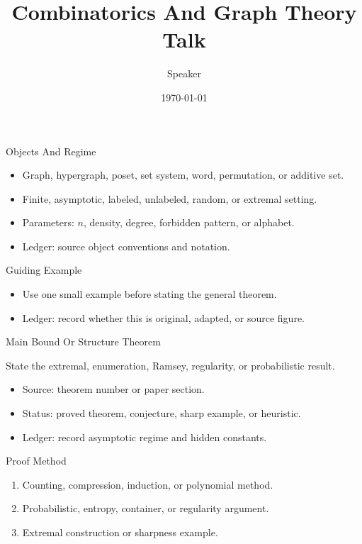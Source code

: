 \documentclass[10pt,aspectratio=169]{beamer}
\title{Combinatorics And Graph Theory Talk}
\author{Speaker}
\date{\today}
\begin{document}
\begin{frame}\titlepage\end{frame}

\begin{frame}{Objects And Regime}
  \begin{itemize}
    \item Graph, hypergraph, poset, set system, word, permutation, or additive set.
    \item Finite, asymptotic, labeled, unlabeled, random, or extremal setting.
    \item Parameters: \(n\), density, degree, forbidden pattern, or alphabet.
    \item Ledger: source object conventions and notation.
  \end{itemize}
\end{frame}

\begin{frame}{Guiding Example}
  \centering
  \begin{itemize}
    \item Use one small example before stating the general theorem.
    \item Ledger: record whether this is original, adapted, or source figure.
  \end{itemize}
\end{frame}

\begin{frame}{Main Bound Or Structure Theorem}
  \begin{theorem}
    State the extremal, enumeration, Ramsey, regularity, or probabilistic result.
  \end{theorem}
  \begin{itemize}
    \item Source: theorem number or paper section.
    \item Status: proved theorem, conjecture, sharp example, or heuristic.
    \item Ledger: record asymptotic regime and hidden constants.
  \end{itemize}
\end{frame}

\begin{frame}{Proof Method}
  \begin{enumerate}
    \item Counting, compression, induction, or polynomial method.
    \item Probabilistic, entropy, container, or regularity argument.
    \item Extremal construction or sharpness example.
  \end{enumerate}
\end{frame}
\end{document}
